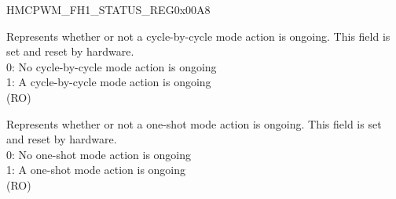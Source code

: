 \begin{register}{H}{MCPWM\_FH1\_STATUS\_REG}{0x00A8}\label{regdesc:MCPWMFH1STATUSREG}
%
%
%
\regnewline%
\begin{regdesc}\begin{reglist}
\label{fielddesc:MCPWMFH1CBCON}\item [MCPWM\_FH1\_CBC\_ON] Represents whether or not a cycle-by-cycle mode action is ongoing. This field is set and reset by hardware. \\
0: No cycle-by-cycle mode action is ongoing\\
1: A cycle-by-cycle mode action is ongoing\\
(RO)
\label{fielddesc:MCPWMFH1OSTON}\item [MCPWM\_FH1\_OST\_ON] Represents whether or not a one-shot mode action is ongoing. This field is set and reset by hardware. \\
0: No one-shot mode action is ongoing\\
1: A one-shot mode action is ongoing\\
(RO)
\end{reglist}\end{regdesc}
\end{register}



